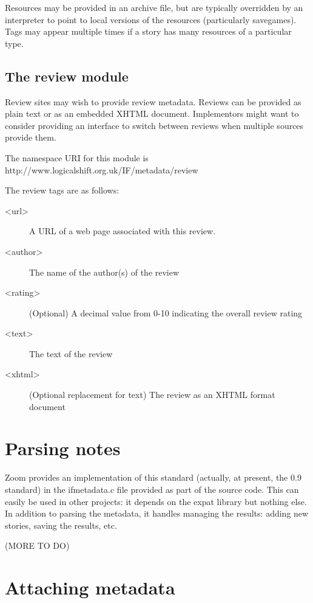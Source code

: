 \documentclass[a4paper,11pt]{article}
\begin{document}
Resources may be provided in an archive file, but are typically overridden by an interpreter
to point to local versions of the resources (particularly savegames). Tags may appear multiple
times if a story has many resources of a particular type.

\subsection{The review module}

Review sites may wish to provide review metadata. Reviews can be provided as plain text
or as an embedded XHTML document. Implementors might want to consider providing
an interface to switch between reviews when multiple sources provide them. 

The namespace URI for this module is http://www.logicalshift.org.uk/IF/metadata/review

The review tags are as follows:

\begin{description}
\item[<url>] A URL of a web page associated with this review.
\item[<author>] The name of the author(s) of the review
\item[<rating>] (Optional) A decimal value from 0-10 indicating the overall review rating
\item[<text>] The text of the review
\item[<xhtml>] (Optional replacement for text) The review as an XHTML format document
\end{description}

\section{Parsing notes}

Zoom provides an implementation of this standard (actually, at present, the 0.9 standard) in
the ifmetadata.c file provided as part of the source code. This can easily be used in other
projects: it depends on the expat library but nothing else. In addition to parsing the metadata,
it handles managing the results: adding new stories, saving the results, etc.

(MORE TO DO)

\section{Attaching metadata}
\end{document}
